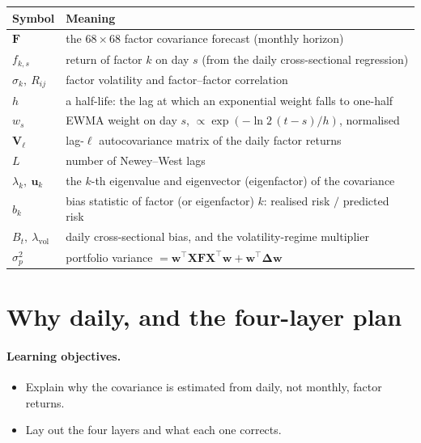 \documentclass[11pt]{article}
\theoremstyle{definition}
\theoremstyle{plain}
\theoremstyle{remark}
\newcommand{\T}{^{\!\top}}
\newcommand{\wvec}{\mathbf{w}}
\newcommand{\Xmat}{\mathbf{X}}
\newcommand{\Fmat}{\mathbf{F}}
\newcommand{\Vmat}{\mathbf{V}}
\newcommand{\Del}{\boldsymbol{\Delta}}
\begin{document}
\begin{center}
\begin{tabular}{@{}ll@{}}
\toprule
Symbol & Meaning \\
\midrule
$\Fmat$ & the $68\times68$ factor covariance forecast (monthly horizon) \\
$f_{k,s}$ & return of factor $k$ on day $s$ (from the daily cross-sectional regression) \\
$\sigma_k,\ R_{ij}$ & factor volatility and factor--factor correlation \\
$h$ & a half-life: the lag at which an exponential weight falls to one-half \\
$w_s$ & EWMA weight on day $s$, $\propto \exp(-\ln 2\,(t-s)/h)$, normalised \\
$\Vmat_\ell$ & lag-$\ell$ autocovariance matrix of the daily factor returns \\
$L$ & number of Newey--West lags \\
$\lambda_k,\ \mathbf{u}_k$ & the $k$-th eigenvalue and eigenvector (eigenfactor) of the covariance \\
$b_k$ & bias statistic of factor (or eigenfactor) $k$: realised risk $/$ predicted risk \\
$B_t,\ \lambda_{\text{vol}}$ & daily cross-sectional bias, and the volatility-regime multiplier \\
$\sigma_p^2$ & portfolio variance $=\wvec\T\Xmat\Fmat\Xmat\T\wvec+\wvec\T\Del\wvec$ \\
\bottomrule
\end{tabular}
\end{center}

\section{Why daily, and the four-layer plan}\label{sec:plan}

\paragraph{Learning objectives.}
\begin{itemize}[leftmargin=1.4em,topsep=2pt]
  \item Explain why the covariance is estimated from daily, not monthly, factor returns.
  \item Lay out the four layers and what each one corrects.
\end{itemize}
\end{document}
